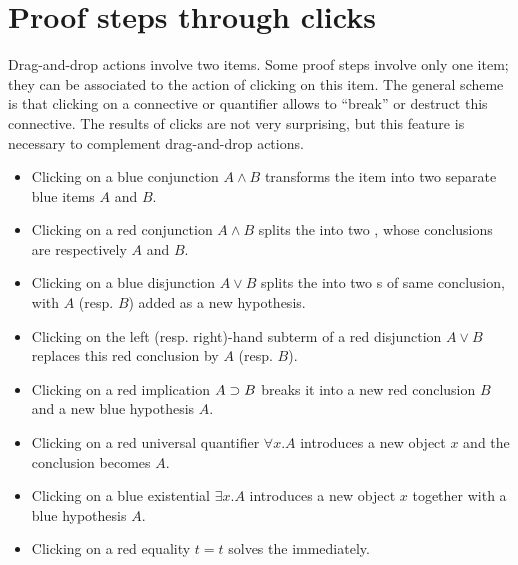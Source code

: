 \section{Proof steps through clicks}
Drag-and-drop actions involve two items. Some proof steps involve only
one item; they can be associated to the action of clicking on this
item. The general scheme is that clicking on a connective or quantifier
allows to ``break'' or destruct this connective. The results of clicks
are not very surprising, but this feature is necessary to complement
drag-and-drop actions.
\begin{itemize}
\item Clicking on a blue conjunction $A\land B$ transforms the
    item into two separate blue items $A$ and $B$.
\item Clicking on a red conjunction $A\land B$ splits the  into
    two , whose conclusions are respectively $A$ and $B$.
\item Clicking on a blue disjunction $A\lor B$ splits the  into two s
    of same conclusion, with $A$ (resp. $B$) added as a new hypothesis.
\item Clicking on the left (resp. right)-hand subterm of a red
      disjunction $A\lor B$ replaces this red conclusion by $A$
      (resp. $B$).
\item Clicking on a red implication $A\supset B$ breaks it into a
      new red conclusion $B$ and a new blue hypothesis $A$.
\item Clicking on a red universal quantifier $\forall x.A$ introduces
  a new object $x$ and the conclusion becomes $A$.
\item Clicking on a blue existential $\exists x.A$ introduces a new
  object $x$ together with a blue hypothesis $A$.
\item Clicking on a red equality $t = t$ solves the  immediately.
\end{itemize}


